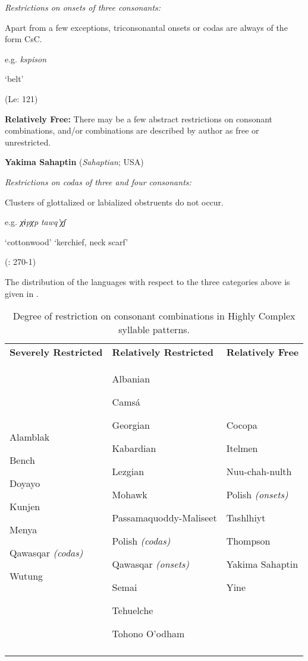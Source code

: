 \textit{Restrictions on onsets of three consonants:}

Apart from a few exceptions, triconsonantal onsets or codas are always of the form CsC.

e.g.  \textit{kspison}

    ‘belt’

(Le\citealt{Sourd1993}: 121)
\z
\z

\ea\label{ex:3.29}
  \textbf{Relatively Free:} There may be a few abstract restrictions on consonant combinations, and/or combinations are described by author as free or unrestricted.


\ea
\textbf{Yakima Sahaptin} (\textit{Sahaptian}; USA)

\textit{Restrictions on codas of three and four consonants:}

Clusters of glottalized or labialized obstruents do not occur.

e.g.   \textit{χɨpχp}        \textit{tawq’χʃ}

    ‘cottonwood’      ‘kerchief, neck scarf’

(\citealt{HargusBeavert2002}: 270-1)
\z
\z

  The distribution of the languages with respect to the three categories above is given in .

\begin{table}
\begin{tabularx}{\textwidth}{XXX}
\lsptoprule

\textbf{Severely Restricted} & \textbf{Relatively Restricted}  & \textbf{Relatively Free}\\
Alamblak

Bench

Doyayo

Kunjen

Menya

Qawasqar \textit{(codas)}

Wutung & Albanian

Camsá

Georgian

Kabardian

Lezgian

Mohawk

Passamaquoddy-Maliseet

Polish \textit{(codas)}

Qawasqar \textit{(onsets)}

Semai

Tehuelche

Tohono O’odham & Cocopa

Itelmen

Nuu-chah-nulth

Polish \textit{(onsets)}

Tashlhiyt

Thompson

Yakima Sahaptin

Yine\\
\lspbottomrule
\end{tabularx}
\caption{\label{tab:3.13}Degree of restriction on consonant combinations in Highly Complex syllable patterns.}
\end{table}

